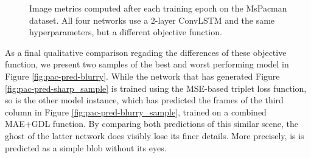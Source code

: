 \begin{figure}[htb]
\begin{subfigure}{0.5\textwidth}
{
  }
  \caption{}
  \label{fig:plot-pac-loss-ssim}
\end{subfigure}
\caption[Comparison of Image Metrics on MsPacman]{Image metrics computed after each training epoch on the MsPacman dataset. All four networks use a 2-layer ConvLSTM and the same hyperparameters, but a different objective function.} \label{fig:plot-pac-imgmetric}
\end{figure}

As a final qualitative comparison regading the differences of these objective function, we present two samples of the best and worst performing model in Figure \ref{fig:pac-pred-blurry}. While the network that has generated Figure \ref{fig:pac-pred-sharp_sample} is trained using the MSE-based triplet loss function, so is the other model instance, which has predicted the frames of the third column in Figure \ref{fig:pac-pred-blurry_sample}, trained on a combined MAE+GDL function. By comparing both predictions of this similar scene, the ghost of the latter network does visibly lose its finer details. More precisely, is is predicted as a simple blob without its eyes. 

